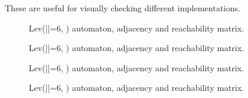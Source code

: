 \documentclass[sigplan,review,acmsmall,nonacm,screen,anonymous]{acmart}\settopmatter{printfolios=false,printccs=false,printacmref=false}
\begin{document}
These are useful for visually checking different implementations.

\begin{figure}[H]
\begin{center}
\end{center}
\caption{Lev(|\sigma|=6, ) automaton, adjacency and reachability matrix.}
\end{figure}

\begin{figure}[H]
\begin{center}
\end{center}
\caption{Lev(|\sigma|=6, ) automaton, adjacency and reachability matrix.}
\end{figure}

\begin{figure}[H]
\begin{center}
\end{center}
\caption{Lev(|\sigma|=6, ) automaton, adjacency and reachability matrix.}
\end{figure}

\begin{figure}[H]
\begin{center}
\end{center}
\caption{Lev(|\sigma|=6, ) automaton, adjacency and reachability matrix.}
\end{figure}
\end{document}
